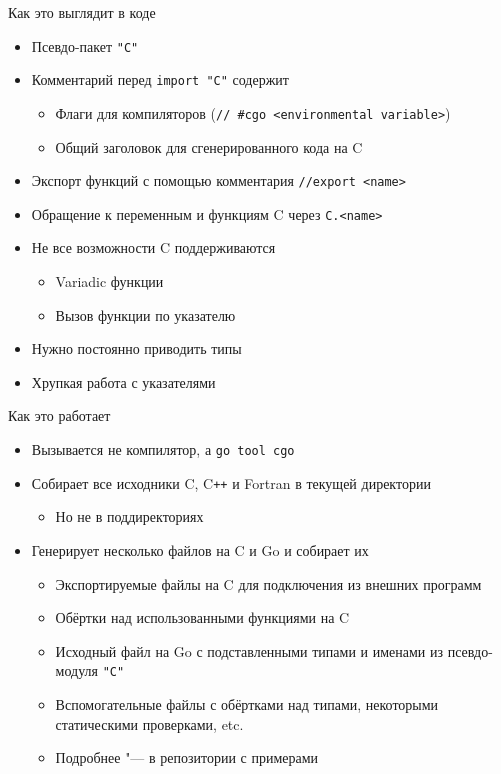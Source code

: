 \documentclass{beamer}
\newcommand\cpp{C\texttt{++}\xspace}
\begin{document}
\begin{frame}[fragile]{Как это выглядит в коде}
    \begin{itemize}
        \item Псевдо-пакет \texttt{"C"}
        \item Комментарий перед \texttt{import "C"} содержит
            \begin{itemize}
                \item Флаги для компиляторов
                    (\texttt{// #cgo <environmental variable>})
                \item Общий заголовок для сгенерированного кода на C
            \end{itemize}
        \item Экспорт функций с помощью комментария \texttt{//export <name>}
        \item Обращение к переменным и функциям C через \texttt{C.<name>}
        \item Не все возможности C поддерживаются
            \begin{itemize}
                \item Variadic функции
                \item Вызов функции по указателю
            \end{itemize}
        \item Нужно постоянно приводить типы
        \item Хрупкая работа с указателями
    \end{itemize}
\end{frame}

\begin{frame}{Как это работает}
    \begin{itemize}
        \item Вызывается не компилятор, а \texttt{go tool cgo}
        \item Собирает все исходники C, \cpp и Fortran в текущей директории
            \begin{itemize}
                \item Но не в поддиректориях
            \end{itemize}
        \item Генерирует несколько файлов на C и Go и собирает их
            \begin{itemize}
                \item Экспортируемые файлы на C для подключения из внешних программ
                \item Обёртки над использованными функциями на C
                \item Исходный файл на Go с подставленными типами и именами из псевдо-модуля
                    \texttt{"C"}
                \item Вспомогательные файлы с обёртками над типами, некоторыми статическими
                    проверками, etc.
                \item Подробнее "--- в репозитории с примерами
            \end{itemize}
    \end{itemize}
\end{frame}
\end{document}
